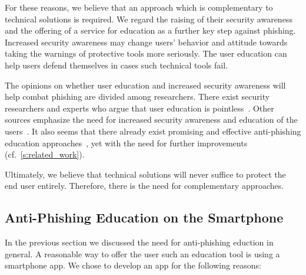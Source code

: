 For these reasons, we believe that an approach which is complementary to technical solutions is required.
We regard the raising of their security awareness and the offering of a service for education as a further key step against phishing.
Increased security awareness may change users' behavior and attitude towards taking the warnings of protective tools more seriously.
The user education can help users defend themselves in cases such technical tools fail.

The opinions on whether user education and increased security awareness will help combat phishing are divided among researchers.
There exist security researchers and experts who argue that user education is pointless~\cite{useredupointless, bruceschneieronsecuritytraining}.
Other sources emphasize the need for increased security awareness and education of the users~\cite{usereducebit, usereduscmagazine}.
It also seems that there already exist promising and effective anti-phishing education approaches~\cite{kumaraguru2007protecting, sheng2007antiphishingphil}, yet with the need for further improvements (cf.~\autoref{s:related_work}).

Ultimately, we believe that technical solutions will never suffice to protect the end user entirely.
Therefore, there is the need for complementary approaches.

\subsection{Anti-Phishing Education on the Smartphone}
\label{s:antiphishing_on_smartphone}
In the previous section we discussed the need for anti-phishing eduction in general. A reasonable way to offer the user such an education tool is using a smartphone app.
We chose to develop an app for the following reasons:

